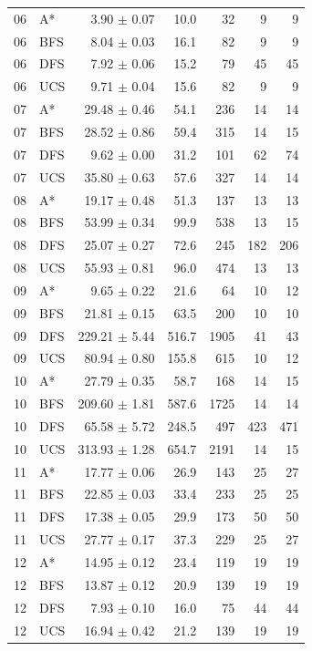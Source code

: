 \begin{longtable}{@{}c l r r r r r@{}}
06 & A* & 3.90 $\pm$ 0.07 & 10.0 & 32 & 9 & 9 \\
06 & BFS & 8.04 $\pm$ 0.03 & 16.1 & 82 & 9 & 9 \\
06 & DFS & 7.92 $\pm$ 0.06 & 15.2 & 79 & 45 & 45 \\
06 & UCS & 9.71 $\pm$ 0.04 & 15.6 & 82 & 9 & 9 \\
07 & A* & 29.48 $\pm$ 0.46 & 54.1 & 236 & 14 & 14 \\
07 & BFS & 28.52 $\pm$ 0.86 & 59.4 & 315 & 14 & 15 \\
07 & DFS & 9.62 $\pm$ 0.00 & 31.2 & 101 & 62 & 74 \\
07 & UCS & 35.80 $\pm$ 0.63 & 57.6 & 327 & 14 & 14 \\
08 & A* & 19.17 $\pm$ 0.48 & 51.3 & 137 & 13 & 13 \\
08 & BFS & 53.99 $\pm$ 0.34 & 99.9 & 538 & 13 & 15 \\
08 & DFS & 25.07 $\pm$ 0.27 & 72.6 & 245 & 182 & 206 \\
08 & UCS & 55.93 $\pm$ 0.81 & 96.0 & 474 & 13 & 13 \\
09 & A* & 9.65 $\pm$ 0.22 & 21.6 & 64 & 10 & 12 \\
09 & BFS & 21.81 $\pm$ 0.15 & 63.5 & 200 & 10 & 10 \\
09 & DFS & 229.21 $\pm$ 5.44 & 516.7 & 1905 & 41 & 43 \\
09 & UCS & 80.94 $\pm$ 0.80 & 155.8 & 615 & 10 & 12 \\
10 & A* & 27.79 $\pm$ 0.35 & 58.7 & 168 & 14 & 15 \\
10 & BFS & 209.60 $\pm$ 1.81 & 587.6 & 1725 & 14 & 14 \\
10 & DFS & 65.58 $\pm$ 5.72 & 248.5 & 497 & 423 & 471 \\
10 & UCS & 313.93 $\pm$ 1.28 & 654.7 & 2191 & 14 & 15 \\
11 & A* & 17.77 $\pm$ 0.06 & 26.9 & 143 & 25 & 27 \\
11 & BFS & 22.85 $\pm$ 0.03 & 33.4 & 233 & 25 & 25 \\
11 & DFS & 17.38 $\pm$ 0.05 & 29.9 & 173 & 50 & 50 \\
11 & UCS & 27.77 $\pm$ 0.17 & 37.3 & 229 & 25 & 27 \\
12 & A* & 14.95 $\pm$ 0.12 & 23.4 & 119 & 19 & 19 \\
12 & BFS & 13.87 $\pm$ 0.12 & 20.9 & 139 & 19 & 19 \\
12 & DFS & 7.93 $\pm$ 0.10 & 16.0 & 75 & 44 & 44 \\
12 & UCS & 16.94 $\pm$ 0.42 & 21.2 & 139 & 19 & 19 \\

\end{longtable}
